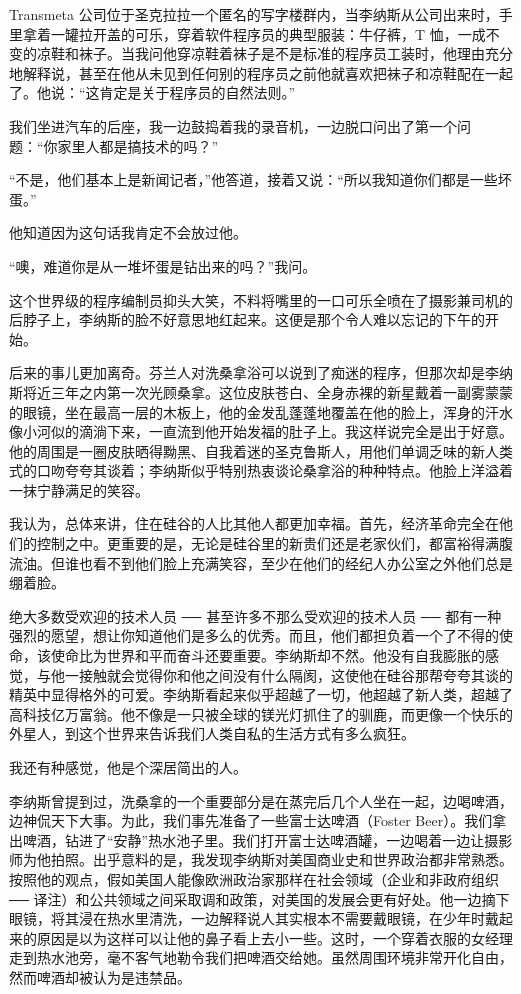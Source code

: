 Transmeta 公司位于圣克拉拉一个匿名的写字楼群内，当李纳斯从公司出来时，手里拿着一罐拉开盖的可乐，穿着软件程序员的典型服装：牛仔裤，T 恤，一成不变的凉鞋和袜子。当我问他穿凉鞋着袜子是不是标准的程序员工装时，他理由充分地解释说，甚至在他从未见到任何别的程序员之前他就喜欢把袜子和凉鞋配在一起了。他说：“这肯定是关于程序员的自然法则。”

我们坐进汽车的后座，我一边鼓捣着我的录音机，一边脱口问出了第一个问题：“你家里人都是搞技术的吗？”

“不是，他们基本上是新闻记者，”他答道，接着又说：“所以我知道你们都是一些坏蛋。”

他知道因为这句话我肯定不会放过他。

“噢，难道你是从一堆坏蛋是钻出来的吗？”我问。

这个世界级的程序编制员抑头大笑，不料将嘴里的一口可乐全喷在了摄影兼司机的后脖子上，李纳斯的脸不好意思地红起来。这便是那个令人难以忘记的下午的开始。

后来的事儿更加离奇。芬兰人对洗桑拿浴可以说到了痴迷的程序，但那次却是李纳斯将近三年之内第一次光顾桑拿。这位皮肤苍白、全身赤裸的新星戴着一副雾蒙蒙的眼镜，坐在最高一层的木板上，他的金发乱蓬蓬地覆盖在他的脸上，浑身的汗水像小河似的滴淌下来，一直流到他开始发福的肚子上。我这样说完全是出于好意。他的周围是一圈皮肤晒得黝黑、自我着迷的圣克鲁斯人，用他们单调乏味的新人类式的口吻夸夸其谈着；李纳斯似乎特别热衷谈论桑拿浴的种种特点。他脸上洋溢着一抹宁静满足的笑容。

我认为，总体来讲，住在硅谷的人比其他人都更加幸福。首先，经济革命完全在他们的控制之中。更重要的是，无论是硅谷里的新贵们还是老家伙们，都富裕得满腹流油。但谁也看不到他们脸上充满笑容，至少在他们的经纪人办公室之外他们总是绷着脸。

绝大多数受欢迎的技术人员 ── 甚至许多不那么受欢迎的技术人员 ── 都有一种强烈的愿望，想让你知道他们是多么的优秀。而且，他们都担负着一个了不得的使命，该使命比为世界和平而奋斗还要重要。李纳斯却不然。他没有自我膨胀的感觉，与他一接触就会觉得你和他之间没有什么隔阂，这使他在硅谷那帮夸夸其谈的精英中显得格外的可爱。李纳斯看起来似乎超越了一切，他超越了新人类，超越了高科技亿万富翁。他不像是一只被全球的镁光灯抓住了的驯鹿，而更像一个快乐的外星人，到这个世界来告诉我们人类自私的生活方式有多么疯狂。

我还有种感觉，他是个深居简出的人。

李纳斯曾提到过，洗桑拿的一个重要部分是在蒸完后几个人坐在一起，边喝啤酒，边神侃天下大事。为此，我们事先准备了一些富士达啤酒（Foster Beer）。我们拿出啤酒，钻进了“安静”热水池子里。我们打开富士达啤酒罐，一边喝着一边让摄影师为他拍照。出乎意料的是，我发现李纳斯对美国商业史和世界政治都非常熟悉。按照他的观点，假如美国人能像欧洲政治家那样在社会领域（企业和非政府组织 ── 译注）和公共领域之间采取调和政策，对美国的发展会更有好处。他一边摘下眼镜，将其浸在热水里清洗，一边解释说人其实根本不需要戴眼镜，在少年时戴起来的原因是以为这样可以让他的鼻子看上去小一些。这时，一个穿着衣服的女经理走到热水池旁，毫不客气地勒令我们把啤酒交给她。虽然周围环境非常开化自由，然而啤酒却被认为是违禁品。

